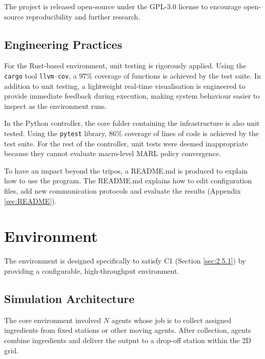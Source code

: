 The project is released open-source under the GPL-3.0 license to encourage open-source reproducibility and further research.


\subsection{Engineering Practices}
\label{sec:3.1.3}

For the Rust-based environment, unit testing is rigorously applied.
Using the \lstinline[language=Rust]|cargo| tool \lstinline[language=Rust]|llvm-cov|, a $97\%$ coverage of functions is achieved by the test suite.
In addition to unit testing, a lightweight real-time visualisation is engineered to provide immediate feedback during execution, making system behaviour easier to inspect as the environment runs.

In the Python controller, the core folder containing the infrastructure is also unit tested.
Using the \lstinline[language=Python]|pytest| library, $86\%$ coverage of lines of code is achieved by the test suite.
For the rest of the controller, unit tests were deemed inappropriate because they cannot evaluate macro-level MARL policy convergence.

To have an impact beyond the tripos, a README.md is produced to explain how to use the program.
The README.md explains how to edit configuration files, add new communication protocols and evaluate the results (Appendix \ref{sec:README}).

\section{Environment}
\label{sec:3.2}

The environment is designed specifically to satisfy C1 (Section \ref{sec:2.5.1}) by providing a configurable, high-throughput environment.

\subsection{Simulation Architecture}
\label{sec:3.2.1}

The core environment involved $N$ agents whose job is to collect assigned ingredients from fixed stations or other moving agents.
After collection, agents combine ingredients and deliver the output to a drop-off station within the 2D grid.

